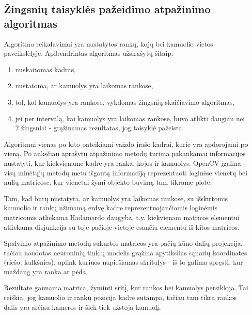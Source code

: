 \documentclass{VUMIFPSbakalaurinis}
\begin{document}
\subsection{Žingsnių taisyklės pažeidimo atpažinimo algoritmas}

Algoritmo reikalavimai yra nustatytos rankų, kojų bei kamuolio vietos paveikslėlyje. Apibendrintas algoritmas užsirašytų šitaip: 

\begin{enumerate}
	\item nuskaitomas kadras,
	\item nustatoma, ar kamuolys yra laikomas rankose,
	\item tol, kol kamuolys yra rankose, vykdomas žingsnių skaičiavimo algoritmas,
	\item jei per intervalą, kai kamuolys yra laikomas rankose, buvo atlikti daugiau nei 2 žingsniai - grąžinamas rezultatas, jog taisyklė pažeista.
\end{enumerate}

Algoritmui vienas po kito pateikiami vaizdo įrašo kadrai, kurie yra apdorojami po vieną. Po anksčiau aprašytų atpažinimo metodų turima pakankamai informacijos nustatyti, kur kiekviename kadre yra ranka, kojos ir kamuolys. OpenCV įgalina visų minėtųjų metodų metu išgautą informaciją reprezentuoti loginėse vienetų bei nulių matricose, kur vienetai žymi objekto buvimą tam tikrame plote. 

Tam, kad būtų nustatyta, ar kamuolys yra laikomas rankose, su išskirtomis kamuolio ir rankų užimamą erdvę kadre reprezentuojančiomis loginėmis matricomis atliekama Hadamardo daugyba, t.y. kiekvienam matricos elementui atliekama disjunkcija su toje pačioje vietoje esančiu elementu iš kitos matricos.

Spalvinio atpažinimo metodų sukurtos matricos yra pačių kūno dalių projekcija, tačiau naudotas neuroninių tinklų modelis grąžina apytikslias sąnarių koordinates (riešo, kulkšnies), aplink kuriuos nupiešiamas skritulys - iš to galima spręsti, kur maždaug yra ranka ar pėda.  

Rezultate gaunama matrica, žyminti sritį, kur rankos bei kamuolys persikloja. Tai reiškia, jog kamuolio ir rankų pozicija kadre sutampa, tačiau tam tikra rankos dalis yra arčiau kameros ir šiek tiek užstoja kamuolį. 
\end{document}

